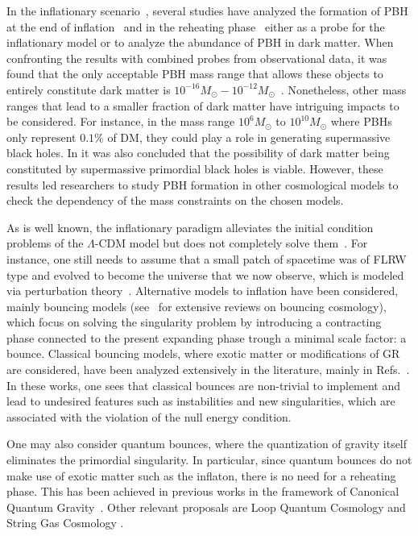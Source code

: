 \documentclass[a4paper,11pt]{article}
\begin{document}
In the inflationary scenario~\cite{Starobinskii1979, Guth1981, Bardeen1983, Linde1982},
several studies have analyzed the formation of PBH at the end of
inflation~\cite{Bullock1997, Yokoyama1998, Josan2010, Ballesteros2018, Wang2024} and in
the reheating phase~\cite{Carr2018, Martin2020} either as a probe for the inflationary
model or to analyze the abundance of PBH in dark matter. When confronting the results
with combined probes from observational data, it was found that the only acceptable PBH
mass range that allows these objects to entirely constitute dark matter is
$10^{-16}M_\odot - 10^{-12}M_\odot$~\cite{Carr2022, Villanueva2021}. Nonetheless, other
mass ranges that lead to a smaller fraction of dark matter have intriguing impacts to be
considered. For instance, in the mass range $10^6M_\odot$ to $10^{10} M_\odot$ where
PBHs only represent $0.1\%$ of DM, they could play a role in generating supermassive
black holes. In \cite{Garcia2017} it was also concluded that the possibility of dark
matter being constituted by supermassive primordial black holes is viable. However,
these results led researchers to study PBH formation in other cosmological models to
check the dependency of the mass constraints on the chosen models.

As is well known, the inflationary paradigm alleviates the initial condition problems of
the $\Lambda$-CDM model but does not completely solve
them~\cite{Guth1981,nelson2021bouncing, PatrickReview2}. For instance, one still needs
to assume that a small patch of spacetime was of FLRW type and evolved to become the
universe that we now observe, which is modeled via perturbation
theory~\cite{covariant_bardeen}. Alternative models to inflation have been considered,
mainly bouncing models (see~\cite{Gasperini1993, Gasperini1994, Lyth, Finelli,
	Wands1999, Brandenberger2001, Peter2002, Hwang2002, Vitenti2012, Vitenti2013,
	PatrickReview1} for extensive reviews on bouncing cosmology), which focus on solving the
singularity problem by introducing a contracting phase connected to the present
expanding phase trough a minimal scale factor: a bounce. Classical bouncing models,
where exotic matter or modifications of GR are considered, have been analyzed
extensively in the literature, mainly in Refs.~\cite{PatrickReview1, PatrickReview2}. In
these works, one sees that classical bounces are non-trivial to implement and lead to
undesired features such as instabilities and new singularities, which are associated
with the violation of the null energy condition.

One may also consider quantum bounces, where the quantization of gravity itself
eliminates the primordial singularity. In particular, since quantum bounces do not make
use of exotic matter such as the inflaton, there is no need for a reheating phase. This
has been achieved in previous works in the framework of Canonical Quantum
Gravity~\cite{nelson_peter_bouncing_original}. Other relevant proposals are Loop Quantum
Cosmology \cite{loop_quantum_gravity_perturbations_application,loop_phenomenology} and
String Gas Cosmology \cite{PatrickReview2, PatrickReview1}.
\end{document}
